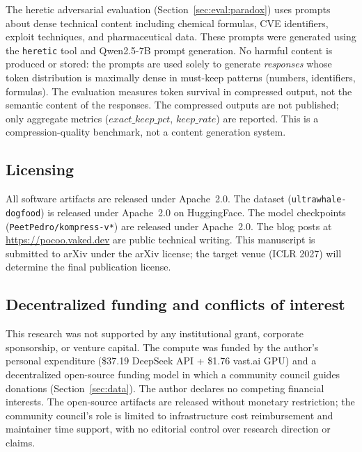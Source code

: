 The heretic adversarial evaluation (Section~\ref{sec:eval:paradox}) uses
prompts about dense technical content including chemical formulas, CVE
identifiers, exploit techniques, and pharmaceutical data. These prompts were
generated using the \texttt{heretic} tool \citep{heretic2024} and
Qwen2.5-7B prompt generation. No harmful content is produced or stored: the
prompts are used solely to generate \emph{responses} whose token distribution
is maximally dense in must-keep patterns (numbers, identifiers, formulas).
The evaluation measures token survival in compressed output, not the
semantic content of the responses. The compressed outputs are not published;
only aggregate metrics ($\mathit{exact\_keep\_pct}$, $\mathit{keep\_rate}$)
are reported. This is a compression-quality benchmark, not a content
generation system.

\subsection{Licensing}
\label{sec:disclaimer:license}

All software artifacts are released under Apache~2.0. The dataset
(\texttt{ultrawhale-dogfood}) is released under Apache~2.0 on HuggingFace.
The model checkpoints (\texttt{PeetPedro/kompress-v*}) are released under
Apache~2.0. The blog posts at \url{https://pocoo.vaked.dev} are public
technical writing. This manuscript is submitted to arXiv under the arXiv
license; the target venue (ICLR 2027) will determine the final publication
license.

\subsection{Decentralized funding and conflicts of interest}
\label{sec:disclaimer:funding}

This research was not supported by any institutional grant, corporate
sponsorship, or venture capital. The compute was funded by the author's
personal expenditure (\$37.19 DeepSeek API + \$1.76 vast.ai GPU) and a
decentralized open-source funding model in which a community council guides
donations (Section~\ref{sec:data}). The author declares no competing
financial interests. The open-source artifacts are released without
monetary restriction; the community council's role is limited to
infrastructure cost reimbursement and maintainer time support, with no
editorial control over research direction or claims.
